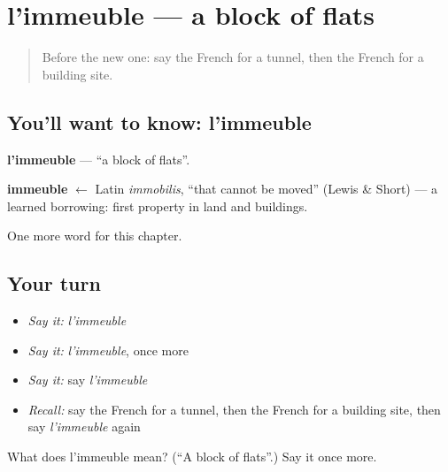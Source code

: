 \section[l'immeuble]{l'immeuble — a block of flats}

\label{lesson:FR-C253-immeuble}



\begin{quote}
Before the new one: say the French for a tunnel, then the French for a building site.
\end{quote}

\subsection*{You'll want to know: l'immeuble}
\textbf{l'immeuble} — \textquotedblleft{}a block of flats\textquotedblright{}.

\begin{cousinweb}
\textbf{immeuble} $\leftarrow$ Latin \emph{immobilis}, \textquotedblleft{}that cannot be moved\textquotedblright{} (Lewis \& Short) — a learned borrowing: first property in land and buildings.
\end{cousinweb}

\begin{grammarlens}[title={What you've built}]
One more word for this chapter.
\end{grammarlens}

\subsection*{Your turn}
\begin{itemize}
\raggedright
  \item \emph{Say it:} \emph{l'immeuble}
  \item \emph{Say it:} \emph{l'immeuble}, once more
  \item \emph{Say it:} say \emph{l'immeuble}
  \item \emph{Recall:} say the French for a tunnel, then the French for a building site, then say \emph{l'immeuble} again
\end{itemize}

\begin{tcolorbox}[breakable,colback=teal!4,colframe=teal!35!black,title={Before you move on}]
What does l'immeuble mean? (\textquotedblleft{}A block of flats\textquotedblright{}.) Say it once more.
\end{tcolorbox}
